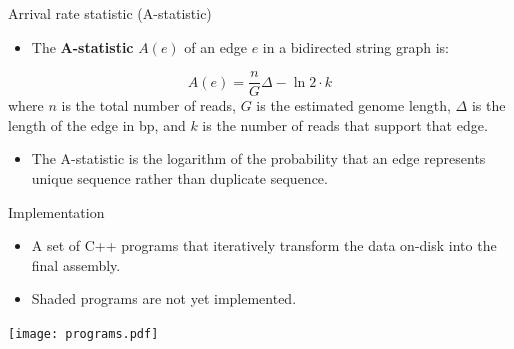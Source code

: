 \documentclass[xcolor=dvipsnames]{beamer}
\begin{document}
\begin{frame}{Arrival rate statistic (A-statistic)}
	\begin{itemize}
		\item The {\bf A-statistic} $A(e)$ of an edge $e$ in a
		bidirected string graph is:
	\end{itemize}
	\[ A(e) = \frac{n}{G} \Delta - \ln{2} \cdot {k} \]
	where $n$ is the total number of reads, $G$ is the estimated genome
	length, $\Delta$ is the length of the edge in bp, and $k$ is the number
	of reads that support that edge.
	\begin{itemize}
		\item The A-statistic is the logarithm of the probability that
		an edge represents unique sequence rather than duplicate
		sequence.
	\end{itemize}
\end{frame}

\begin{frame}{Implementation}
	\begin{minipage}{0.3\textwidth}
		\begin{itemize}
			\item A set of C++ programs that iteratively transform
			the data on-disk into the final assembly.
			\item Shaded programs are not yet implemented.
		\end{itemize}
	\end{minipage}
	\begin{minipage}{0.67\textwidth}
		\texttt{[image: programs.pdf]}
	\end{minipage}
\end{frame}
\end{document}
